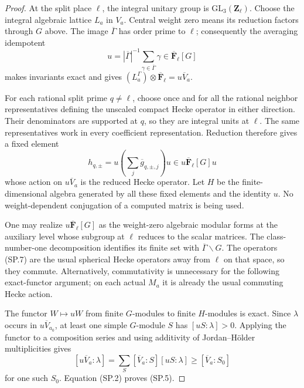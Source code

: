 \documentclass[11pt,a4paper]{article}
\theoremstyle{definition}
\begin{document}
\begin{proof}
At the split place $\ell$, the integral unitary group is
$\mathrm{GL}_3(\mathbf Z_\ell)$. Choose the integral
algebraic lattice $L_a$ in $V_a$. Central weight zero
means its reduction factors through $G$ above. The image
$\overline\Gamma$ has order prime to $\ell$; consequently
the averaging idempotent
\[
       u=|\overline\Gamma|^{-1}
                      \sum_{\gamma\in\overline\Gamma}\gamma
                   \in\overline{\mathbf F}_\ell[G]
                                                               \tag{SP.6}
\]
makes invariants exact and gives
$(L_a^\Gamma)\otimes\overline{\mathbf F}_\ell=u\overline V_a$.

For each rational split prime $q\ne\ell$, choose once and
for all the rational neighbor representatives defining
the unscaled compact Hecke operator in either direction.
Their denominators are supported at $q$, so they are
integral units at $\ell$. The same representatives work
in every coefficient representation. Reduction therefore
gives a fixed element
\[
                h_{q,\pm}=u\left(\sum_j\overline g_{q,\pm,j}\right)u
                          \in u\overline{\mathbf F}_\ell[G]u
                                                               \tag{SP.7}
\]
whose action on $u\overline V_a$ is the reduced Hecke
operator. Let $H$ be the finite-dimensional algebra
generated by all these fixed elements and the identity
$u$. No weight-dependent conjugation of a computed matrix
is being used.

One may realize $u\overline{\mathbf F}_\ell[G]$ as the
weight-zero algebraic modular forms at the auxiliary level
whose subgroup at $\ell$ reduces to the scalar matrices.
The class-number-one decomposition identifies its finite
set with $\overline\Gamma\backslash G$. The operators
(SP.7) are the usual spherical Hecke operators away from
$\ell$ on that space, so they commute. Alternatively,
commutativity is unnecessary for the following exact-functor
argument; on each actual $M_a$ it is already the usual
commuting Hecke action.

The functor $W\mapsto uW$ from finite $G$-modules to
finite $H$-modules is exact. Since $\lambda$ occurs in
$u\overline V_{a_0}$, at least one simple $G$-module $S$
has $[uS:\lambda]>0$. Applying the functor to a composition
series and using additivity of Jordan--H\"older multiplicities
gives
\[
 [u\overline V_a:\lambda]
       =\sum_S[\overline V_a:S][uS:\lambda]
       \geq[\overline V_a:S_0]
                                                               \tag{SP.8}
\]
for one such $S_0$. Equation (SP.2) proves (SP.5).
\end{proof}
\end{document}
